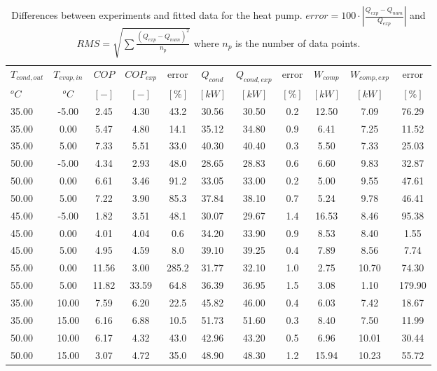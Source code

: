 \documentclass[english]{SPFShortReport}
\begin{document}
\begin{table}[!ht]
\begin{small}
\caption{Differences between experiments and fitted data for the heat pump.          $error=100 \cdot |\frac{Q_{exp}-Q_{num}}{Q_{exp}}|$ and $RMS = \sqrt { \sum{\frac{(Q_{exp}-Q_{num})^2}{n_p}} }$ where $n_p$ is the number of data points.}
\begin{center}
\resizebox{12cm}{!} 
{
\begin{tabular}{l | c c c c c c c c c c } 
\hline
\hline
$T_{cond,out}$ &$T_{evap,in}$ &$COP$ &$COP_{exp}$ &error &$Q_{cond}$ &$Q_{cond,exp}$ &error &$W_{comp}$ &$W_{comp,exp}$ &error \\ 
$^oC$ &$^oC$ &$[-]$ &$[-]$ &$[\%]$ &$[kW]$ &$[kW]$ &$[\%]$ &$[kW]$ &$[kW]$ &$[\%]$\\ 
\hline
35.00  & -5.00 & 2.45 & 4.30 & 43.2 & 30.56 & 30.50 & 0.2 & 12.50 & 7.09 & 76.29\\ 
35.00  & 0.00 & 5.47 & 4.80 & 14.1 & 35.12 & 34.80 & 0.9 & 6.41 & 7.25 & 11.52\\ 
35.00  & 5.00 & 7.33 & 5.51 & 33.0 & 40.30 & 40.40 & 0.3 & 5.50 & 7.33 & 25.03\\ 
50.00  & -5.00 & 4.34 & 2.93 & 48.0 & 28.65 & 28.83 & 0.6 & 6.60 & 9.83 & 32.87\\ 
50.00  & 0.00 & 6.61 & 3.46 & 91.2 & 33.05 & 33.00 & 0.2 & 5.00 & 9.55 & 47.61\\ 
50.00  & 5.00 & 7.22 & 3.90 & 85.3 & 37.84 & 38.10 & 0.7 & 5.24 & 9.78 & 46.41\\ 
45.00  & -5.00 & 1.82 & 3.51 & 48.1 & 30.07 & 29.67 & 1.4 & 16.53 & 8.46 & 95.38\\ 
45.00  & 0.00 & 4.01 & 4.04 & 0.6 & 34.20 & 33.90 & 0.9 & 8.53 & 8.40 & 1.55\\ 
45.00  & 5.00 & 4.95 & 4.59 & 8.0 & 39.10 & 39.25 & 0.4 & 7.89 & 8.56 & 7.74\\ 
55.00  & 0.00 & 11.56 & 3.00 & 285.2 & 31.77 & 32.10 & 1.0 & 2.75 & 10.70 & 74.30\\ 
55.00  & 5.00 & 11.82 & 33.59 & 64.8 & 36.39 & 36.95 & 1.5 & 3.08 & 1.10 & 179.90\\ 
35.00  & 10.00 & 7.59 & 6.20 & 22.5 & 45.82 & 46.00 & 0.4 & 6.03 & 7.42 & 18.67\\ 
35.00  & 15.00 & 6.16 & 6.88 & 10.5 & 51.73 & 51.60 & 0.3 & 8.40 & 7.50 & 11.99\\ 
50.00  & 10.00 & 6.17 & 4.32 & 43.0 & 42.96 & 43.20 & 0.5 & 6.96 & 10.01 & 30.44\\ 
50.00  & 15.00 & 3.07 & 4.72 & 35.0 & 48.90 & 48.30 & 1.2 & 15.94 & 10.23 & 55.72\\ 

\end{tabular}}
\end{center}
\end{small}
\end{table}
\end{document}
